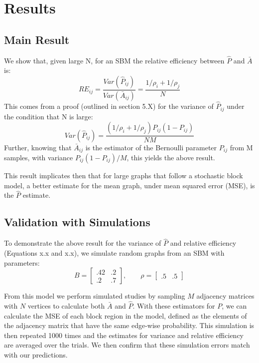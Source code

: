 \section{Results}
\subsection{Main Result}
We show that, given large N, for an SBM the relative efficiency between $\hat{P}$ and $\bar{A}$ is:
\begin{equation}
RE_{ij} =\frac{Var(\hat{P}_{ij})}{Var(\bar{A}_{ij})} = \frac{1/\rho_i + 1/\rho_j}{N}
\end{equation}
This comes from a proof (outlined in section 5.X) for the variance of $\hat{P}_{ij}$ under the condition that N is large:
\begin{equation}
Var(\hat{P}_{ij}) = \frac{(1/\rho_i + 1/\rho_j)P_{ij}(1-P_{ij})}{NM}
\end{equation}
Further, knowing that $\bar{A}_{ij}$ is the estimator of the Bernoulli parameter $P_{ij}$ from M samples, with variance $P_{ij}(1-P_{ij})/M$, this yields the above result.

This result implicates then that for large graphs that follow a stochastic block model, a better estimate for the mean graph, under mean squared error (MSE), is the $\hat{P}$ estimate.
\subsection{Validation with Simulations}
To demonstrate the above result for the variance of $\hat{P}$ and relative efficiency (Equations x.x and x.x), we simulate random graphs from an SBM with parameters:
\begin{equation*}
B = \begin{bmatrix}
.42 & .2 \\
.2 & .7 
\end{bmatrix}
,\qquad \rho = \begin{bmatrix}
.5 & .5
\end{bmatrix}
\end{equation*}

From this model we perform simulated studies by sampling $M$ adjacency matrices with $N$ vertices to calculate both $\bar{A}$ and $\hat{P}$.  With these estimators for $P$, we can calculate the MSE of each block region in the model, defined as the elements of the adjacency matrix that have the same edge-wise probability.  This simulation is then repeated 1000 times and the estimates for variance and relative efficiency are averaged over the trials.  We then confirm that these simulation errors match with our predictions.

